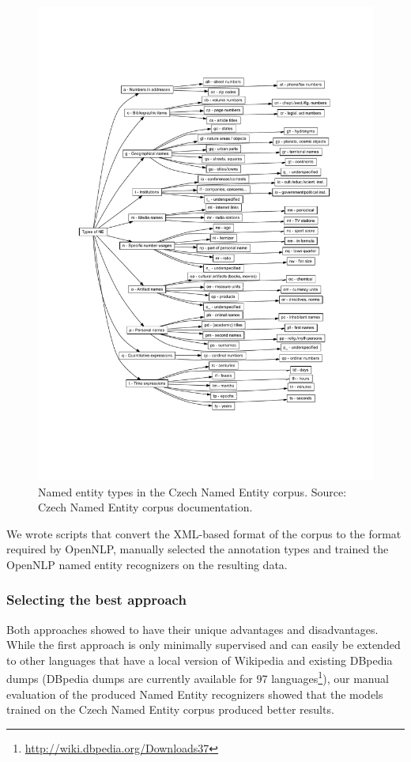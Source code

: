 \begin{figure}[h!]
	\centering
		\includegraphics[width=16
		 cm]{figures/core/CzechNECorpus.pdf}
	\caption{Named entity types in the Czech Named Entity corpus. Source: Czech Named Entity corpus documentation.}
	\label{fig:figures_core_CzechNECorpus}
\end{figure}


We wrote scripts that convert the XML-based format of the corpus to the format required by OpenNLP, 
manually selected the annotation types and trained the OpenNLP named entity recognizers on the resulting data.


\subsubsection*{Selecting the best approach}

Both approaches showed to have their unique advantages and disadvantages. While the first approach is 
only minimally supervised and can easily be extended to other languages that have a local version of 
Wikipedia and existing DBpedia dumps (DBpedia dumps are currently available for 97 languages\footnote{\url{http://wiki.dbpedia.org/Downloads37}}), 
our manual evaluation of the produced Named Entity recognizers showed that the 
models trained on the Czech Named Entity corpus produced better results.

